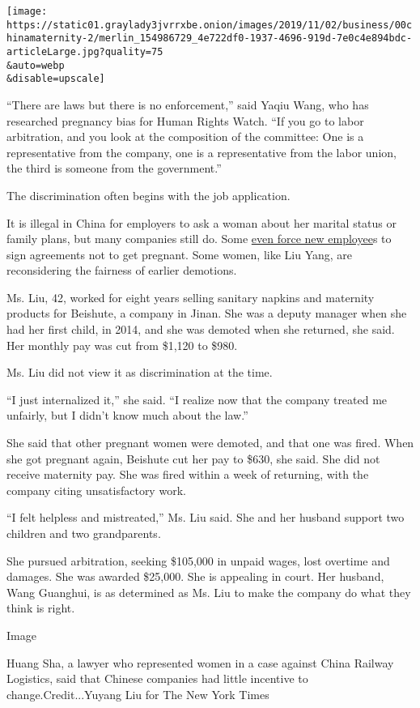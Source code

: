 \texttt{[image: https://static01.graylady3jvrrxbe.onion/images/2019/11/02/business/00chinamaternity-2/merlin\_154986729\_4e722df0-1937-4696-919d-7e0c4e894bdc-articleLarge.jpg?quality=75\\\&auto=webp\\\&disable=upscale]}

``There are laws but there is no enforcement,'' said Yaqiu Wang, who has
researched pregnancy bias for Human Rights Watch. ``If you go to labor
arbitration, and you look at the composition of the committee: One is a
representative from the company, one is a representative from the labor
union, the third is someone from the government.''

The discrimination often begins with the job application.

It is illegal in China for employers to ask a woman about her marital
status or family plans, but many companies still do. Some
\href{https://www.nytimes3xbfgragh.onion/2019/07/16/world/asia/china-women-discrimination.html}{even
force new employee}s to sign agreements not to get pregnant. Some women,
like Liu Yang, are reconsidering the fairness of earlier demotions.

Ms. Liu, 42, worked for eight years selling sanitary napkins and
maternity products for Beishute, a company in Jinan. She was a deputy
manager when she had her first child, in 2014, and she was demoted when
she returned, she said. Her monthly pay was cut from \$1,120 to \$980.

Ms. Liu did not view it as discrimination at the time.

``I just internalized it,'' she said. ``I realize now that the company
treated me unfairly, but I didn't know much about the law.''

She said that other pregnant women were demoted, and that one was fired.
When she got pregnant again, Beishute cut her pay to \$630, she said.
She did not receive maternity pay. She was fired within a week of
returning, with the company citing unsatisfactory work.

``I felt helpless and mistreated,'' Ms. Liu said. She and her husband
support two children and two grandparents.

She pursued arbitration, seeking \$105,000 in unpaid wages, lost
overtime and damages. She was awarded \$25,000. She is appealing in
court. Her husband, Wang Guanghui, is as determined as Ms. Liu to make
the company do what they think is right.

Image

Huang Sha, a lawyer who represented women in a case against China
Railway Logistics, said that Chinese companies had little incentive to
change.Credit...Yuyang Liu for The New York Times

